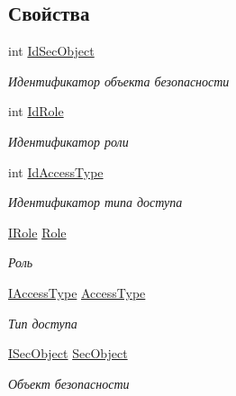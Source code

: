 \subsection*{Свойства}
\begin{DoxyCompactItemize}
\item 
int \hyperlink{interface_security_1_1_interfaces_1_1_model_1_1_i_grant_ae6915ed49863de088e9f8ea5b8b41bed}{Id\+Sec\+Object}
\begin{DoxyCompactList}\small\item\em Идентификатор объекта безопасности \end{DoxyCompactList}\item 
int \hyperlink{interface_security_1_1_interfaces_1_1_model_1_1_i_grant_ab3a05ee44708f93458938610c949cea3}{Id\+Role}
\begin{DoxyCompactList}\small\item\em Идентификатор роли \end{DoxyCompactList}\item 
int \hyperlink{interface_security_1_1_interfaces_1_1_model_1_1_i_grant_a25e05f126521baf12752119067f81474}{Id\+Access\+Type}
\begin{DoxyCompactList}\small\item\em Идентификатор типа доступа \end{DoxyCompactList}\item 
\hyperlink{interface_security_1_1_interfaces_1_1_model_1_1_i_role}{I\+Role} \hyperlink{interface_security_1_1_interfaces_1_1_model_1_1_i_grant_a213d0283361baaa1cae15f56df423ab1}{Role}
\begin{DoxyCompactList}\small\item\em Роль \end{DoxyCompactList}\item 
\hyperlink{interface_security_1_1_interfaces_1_1_model_1_1_i_access_type}{I\+Access\+Type} \hyperlink{interface_security_1_1_interfaces_1_1_model_1_1_i_grant_a30a01b0c95b417e9846e2ae4f4cbcaf3}{Access\+Type}
\begin{DoxyCompactList}\small\item\em Тип доступа \end{DoxyCompactList}\item 
\hyperlink{interface_security_1_1_interfaces_1_1_model_1_1_i_sec_object}{I\+Sec\+Object} \hyperlink{interface_security_1_1_interfaces_1_1_model_1_1_i_grant_af62c0154f06092a8ac1b4841af810c1b}{Sec\+Object}
\begin{DoxyCompactList}\small\item\em Объект безопасности \end{DoxyCompactList}\end{DoxyCompactItemize}


